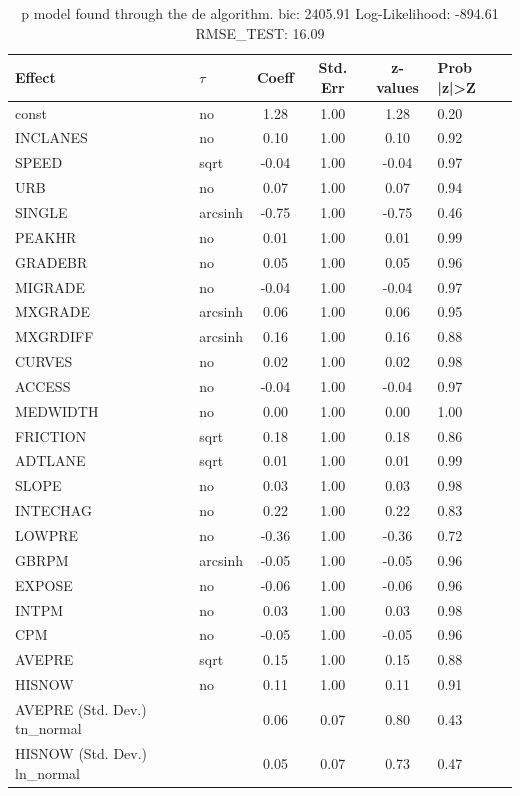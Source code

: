 \begin{table}
	\caption{p model found through the de algorithm. bic: 2405.91 Log-Likelihood: -894.61 RMSE_TEST: 16.09}
	\begin{center}
		\begin{tabular}{|l|l|c|c|c|l|}
			\hline
			Effect & $\tau$ & Coeff & Std. Err & z-values & Prob |z|>Z \\
			\hline
			const & no & 1.28 & 1.00 & 1.28 & 0.20 \\
			\hline
			INCLANES & no & 0.10 & 1.00 & 0.10 & 0.92 \\
			\hline
			SPEED & sqrt & -0.04 & 1.00 & -0.04 & 0.97 \\
			\hline
			URB & no & 0.07 & 1.00 & 0.07 & 0.94 \\
			\hline
			SINGLE & arcsinh & -0.75 & 1.00 & -0.75 & 0.46 \\
			\hline
			PEAKHR & no & 0.01 & 1.00 & 0.01 & 0.99 \\
			\hline
			GRADEBR & no & 0.05 & 1.00 & 0.05 & 0.96 \\
			\hline
			MIGRADE & no & -0.04 & 1.00 & -0.04 & 0.97 \\
			\hline
			MXGRADE & arcsinh & 0.06 & 1.00 & 0.06 & 0.95 \\
			\hline
			MXGRDIFF & arcsinh & 0.16 & 1.00 & 0.16 & 0.88 \\
			\hline
			CURVES & no & 0.02 & 1.00 & 0.02 & 0.98 \\
			\hline
			ACCESS & no & -0.04 & 1.00 & -0.04 & 0.97 \\
			\hline
			MEDWIDTH & no & 0.00 & 1.00 & 0.00 & 1.00 \\
			\hline
			FRICTION & sqrt & 0.18 & 1.00 & 0.18 & 0.86 \\
			\hline
			ADTLANE & sqrt & 0.01 & 1.00 & 0.01 & 0.99 \\
			\hline
			SLOPE & no & 0.03 & 1.00 & 0.03 & 0.98 \\
			\hline
			INTECHAG & no & 0.22 & 1.00 & 0.22 & 0.83 \\
			\hline
			LOWPRE & no & -0.36 & 1.00 & -0.36 & 0.72 \\
			\hline
			GBRPM & arcsinh & -0.05 & 1.00 & -0.05 & 0.96 \\
			\hline
			EXPOSE & no & -0.06 & 1.00 & -0.06 & 0.96 \\
			\hline
			INTPM & no & 0.03 & 1.00 & 0.03 & 0.98 \\
			\hline
			CPM & no & -0.05 & 1.00 & -0.05 & 0.96 \\
			\hline
			AVEPRE & sqrt & 0.15 & 1.00 & 0.15 & 0.88 \\
			\hline
			HISNOW & no & 0.11 & 1.00 & 0.11 & 0.91 \\
			\hline
			AVEPRE (Std. Dev.) tn_normal &  & 0.06 & 0.07 & 0.80 & 0.43 \\
			\hline
			HISNOW (Std. Dev.) ln_normal &  & 0.05 & 0.07 & 0.73 & 0.47 \\
			\hline
		\end{tabular}
	\end{center}
\end{table}